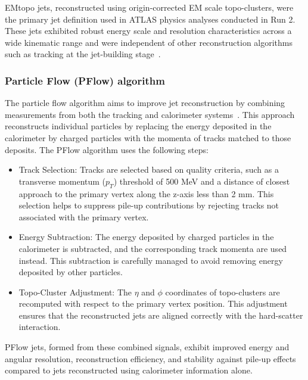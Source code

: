             EMtopo jets, reconstructed using origin-corrected EM scale topo-clusters, 
            were the primary jet definition used in ATLAS physics analyses conducted in Run 2. 
            These jets exhibited robust energy scale and resolution characteristics 
            across a wide kinematic range and were independent of other reconstruction algorithms such as tracking at the 
            jet-building stage~\cite{JETM-2018-05}.

        \subsubsection{Particle Flow (PFlow) algorithm}
            The particle flow algorithm aims to improve jet reconstruction by combining measurements from both 
            the tracking and calorimeter systems~\cite{JETM-2018-05}. This approach reconstructs individual particles by replacing 
            the energy deposited in the calorimeter by charged particles with the momenta of tracks matched to 
            those deposits. The PFlow algorithm uses the following steps:
            \begin{itemize}
                \item Track Selection: Tracks are selected based on quality criteria, such as a transverse momentum 
                (\( p_T \)) threshold of 500 MeV and a distance of closest approach to the primary vertex along the 
                z-axis less than 2 mm. This selection helps to suppress pile-up contributions by rejecting tracks not 
                associated with the primary vertex.
                \item Energy Subtraction: The energy deposited by charged particles in the calorimeter is subtracted, 
                and the corresponding track momenta are used instead. This subtraction is carefully managed to avoid 
                removing energy deposited by other particles.
                \item Topo-Cluster Adjustment: The \( \eta \) and \( \phi \) coordinates of topo-clusters are recomputed
                with respect to the primary vertex position. This adjustment ensures that the reconstructed jets are aligned 
                correctly with the hard-scatter interaction.
            \end{itemize}
            PFlow jets, formed from these combined signals, exhibit improved energy and angular resolution, reconstruction 
            efficiency, and stability against pile-up effects compared to jets reconstructed using calorimeter information alone.

